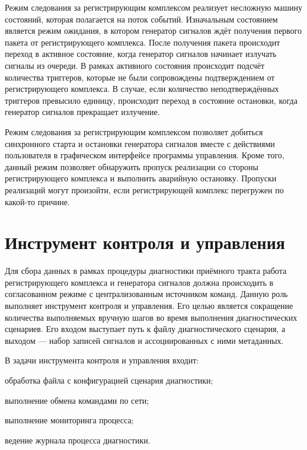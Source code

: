 \documentclass{report}
\begin{document}
Режим следования за регистрирующим комплексом реализует несложную машину состояний, которая полагается на поток событий. Изначальным состоянием является режим ожидания, в котором генератор сигналов ждёт получения первого пакета от регистрирующего комплекса. После получения пакета происходит переход в активное состояние, когда генератор сигналов начинает излучать сигналы из очереди. В рамках активного состояния происходит подсчёт количества триггеров, которые не были сопровождены подтверждением от регистрирующего комплекса. В случае, если количество неподтверждённых триггеров превысило единицу, происходит переход в состояние остановки, когда генератор сигналов прекращает излучение.

Режим следования за регистрирующим комплексом позволяет добиться синхронного старта и остановки генератора сигналов вместе с действиями пользователя в графическом интерфейсе программы управления. Кроме того, данный режим позволяет обнаружить пропуск реализации со стороны регистрирующего комплекса и выполнить аварийную остановку. Пропуски реализаций могут произойти, если регистрирующей комплекс перегружен по какой-то причине.

\section{Инструмент контроля и управления}

Для сбора данных в рамках процедуры диагностики приёмного тракта работа регистрирующего комплекса и генератора сигналов должна происходить в согласованном режиме с централизованным источником команд. Данную роль выполняет инструмент контроля и управления. Его целью является сокращение количества выполняемых вручную шагов во время выполнения диагностических сценариев. Его входом выступает путь к файлу диагностического сценария, а выходом --- набор записей сигналов и ассоциированных с ними метаданных.

В задачи инструмента контроля и управления входит:

\begin{enummarker}
    \item обработка файла с конфигурацией сценария диагностики;
    \item выполнение обмена командами по сети;
    \item выполнение мониторинга процесса;
    \item ведение журнала процесса диагностики.
\end{enummarker}
\end{document}
